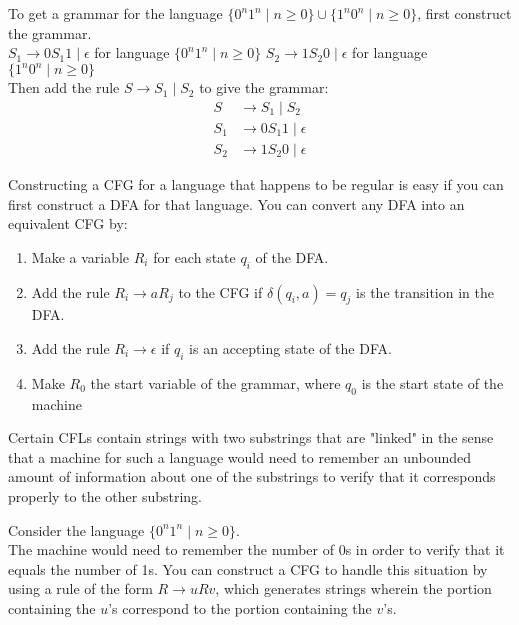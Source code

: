 \documentclass[11pt,a4paper]{article}
\begin{document}
\begin{example}
    To get a grammar for the language $\{0^n1^n\mid n\geq 0\}\cup \{1^n0^n\mid n\geq 0\}$, first construct the grammar. \\

    $S_1\rightarrow 0S_1 1\mid\epsilon$ for language $\{0^n1^n\mid n\geq 0\}$
    $S_2\rightarrow1S_2 0\mid\epsilon$ for language $\{1^n0^n\mid n\geq 0\}$ \\

    Then add the rule $S\rightarrow S_1\mid S_2$ to give the grammar:
    \begin{align*}
        S &\rightarrow S_1\mid S_2 \\
        S_1 &\rightarrow 0S_1 1\mid\epsilon \\
        S_2 &\rightarrow 1S_2 0\mid\epsilon
    \end{align*}
\end{example}

Constructing a CFG for a language that happens to be regular is easy if you can first construct a DFA for that language.
You can convert any DFA into an equivalent CFG by:
\begin{enumerate}
    \item Make a variable $R_i$ for each state $q_i$ of the DFA.
    \item Add the rule $R_i\rightarrow aR_j$ to the CFG if $\delta(q_i,a)=q_j$ is the transition in the DFA.
    \item Add the rule $R_i\rightarrow\epsilon$ if $q_i$ is an accepting state of the DFA.
    \item Make $R_0$ the start variable of the grammar, where $q_0$ is the start state of the machine
\end{enumerate}

Certain CFLs contain strings with two substrings that are "linked" in the sense that a machine for such a language would need to remember an unbounded amount of information about one of the substrings to verify that it corresponds properly to the other substring. \\

\begin{example}
    Consider the language $\{0^n1^n\mid n\geq 0\}$. \\

    The machine would need to remember the number of 0s in order to verify that it equals the number of 1s.
    You can construct a CFG to handle this situation by using a rule of the form $R\rightarrow uRv$, which generates strings wherein the portion containing the $u$'s correspond to the portion containing the $v$'s.
\end{example}
\end{document}

